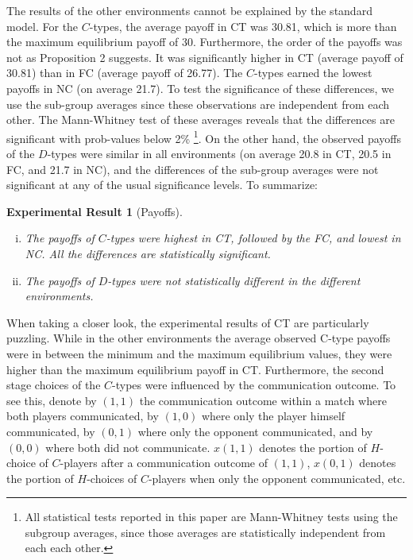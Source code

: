 \documentclass[12pt]{article}
\theoremstyle{break}
\newtheorem{result}{Experimental Result}\theoremstyle{break}
\begin{document}
The results of the other environments cannot be explained by the standard model. For the $C$-types, the average payoff in CT was 30.81, which is more than the maximum equilibrium payoff of 30. Furthermore, the order of the payoffs was not as Proposition 2 suggests. It was significantly higher in CT (average payoff of 30.81) than in FC (average payoff of 26.77). The $C$-types earned the lowest payoffs in NC (on average 21.7). To test the significance of these differences, we use the sub-group averages since these observations are independent from each other. The Mann-Whitney test of these averages reveals that the differences are significant with prob-values below 2\% \footnote{%
All statistical tests reported in this paper are Mann-Whitney tests using the subgroup averages, since those averages are statistically independent from each each other.}. 
On the other hand, the observed payoffs of the $D$-types were similar in all environments (on average 20.8 in CT, 20.5 in FC, and 21.7 in NC), and the differences of the sub-group averages were not significant at any of the usual significance levels. To summarize:

\begin{result}[Payoffs]
	\begin{enumerate}[i)]\setlength\itemsep{0em}
		\item The payoffs of $C$-types were highest in CT, followed by the FC, and lowest in NC. All the differences are statistically significant.
		\item The payoffs of $D$-types were not statistically different in the different environments.
	\end{enumerate}
\end{result}

When taking a closer look, the experimental results of CT are particularly puzzling. While in the other environments the average observed C-type payoffs were in between the minimum and the maximum equilibrium values, they were higher than the maximum equilibrium payoff in CT. Furthermore, the second stage choices of the $C$-types were influenced by the communication outcome. To see this, denote by $(1,1)$ the communication outcome within a match where both players communicated, by $(1,0)$ where only the player himself communicated, by $(0,1)$ where only the opponent communicated, and by $(0,0)$ where both did not communicate. $x(1,1)$ denotes the portion of $H$-choice of $C$-players after a communication outcome of $(1,1)$, $x(0,1)$ denotes the portion of $H$-choices of $C$-players when only the opponent communicated, etc. 
\end{document}
